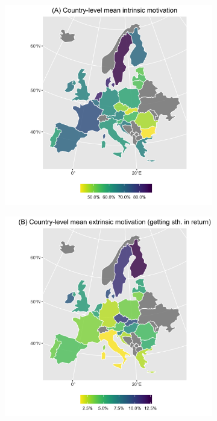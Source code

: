 \documentclass[AER]{AEA}
\begin{document}
\begin{figure}[t!]
\begin{subfigure}{.48\textwidth}
  \centering
  \includegraphics[width=\linewidth]{images/IM.png}  
\end{subfigure}
\begin{subfigure}{.48\textwidth}
  \centering
  \includegraphics[width=\linewidth]{images/EM_get_return.png}  
\end{subfigure}


\end{figure}
\end{document}
